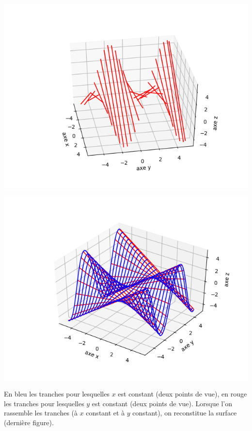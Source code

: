\documentclass[11pt,class=report,crop=false]{standalone}
\begin{document}
\begin{exemple}
\begin{center}
\includegraphics[scale=\myscale,scale=0.5]{figures/fonctions-surface-2d}

\includegraphics[scale=\myscale,scale=0.7]{figures/fonctions-surface-2e}
\end{center}

En bleu les tranches pour lesquelles $x$ est constant (deux points de vue), en rouge les tranches pour lesquelles $y$ est constant (deux points de vue). Lorsque l'on rassemble les tranches (à $x$ constant et à $y$ constant), on reconstitue la surface (dernière figure). 


\end{exemple}
\end{document}
